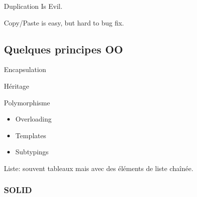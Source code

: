 \documentclass[a4paper,11pt]{article}
\begin{document}
Duplication Is Evil.

Copy/Paste is easy, but hard to bug fix.

\subsection{Quelques principes OO}

Encapsulation

Héritage

Polymorphisme

\begin{itemize}
\item Overloading
\item Templates
\item Subtypings
\end{itemize}

Liste: souvent tableaux mais avec des éléments de liste chaînée.

\subsubsection{SOLID}
\end{document}
